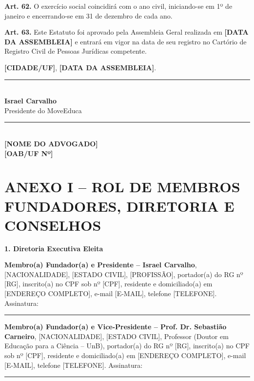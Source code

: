 \documentclass[11pt,a4paper]{article}
\begin{document}
\textbf{Art. 62.} O exercício social coincidirá com o ano civil, iniciando-se em 1º de janeiro e encerrando-se em 31 de dezembro de cada ano.

\textbf{Art. 63.} Este Estatuto foi aprovado pela Assembleia Geral realizada em \textbf{[DATA DA ASSEMBLEIA]} e entrará em vigor na data de seu registro no Cartório de Registro Civil de Pessoas Jurídicas competente.

\vspace{2cm}

\begin{center}
\textbf{[CIDADE/UF]}, \textbf{[DATA DA ASSEMBLEIA]}.

\vspace{2cm}

\rule{8cm}{0.4pt}\\
\textbf{Israel Carvalho}\\
Presidente do MoveEduca

\vspace{1.5cm}

\rule{8cm}{0.4pt}\\
\textbf{[NOME DO ADVOGADO]}\\
\textbf{[OAB/UF Nº]}
\end{center}

\newpage

\section*{ANEXO I -- ROL DE MEMBROS FUNDADORES, DIRETORIA E CONSELHOS}

\textbf{1. Diretoria Executiva Eleita}

\textbf{Membro(a) Fundador(a) e Presidente -- Israel Carvalho}, [NACIONALIDADE], [ESTADO CIVIL], [PROFISSÃO], portador(a) do RG nº [RG], inscrito(a) no CPF sob nº [CPF], residente e domiciliado(a) em [ENDEREÇO COMPLETO], e-mail [E-MAIL], telefone [TELEFONE]. Assinatura: \rule{6cm}{0.4pt}

\vspace{1em}

\textbf{Membro(a) Fundador(a) e Vice-Presidente -- Prof. Dr. Sebastião Carneiro}, [NACIONALIDADE], [ESTADO CIVIL], Professor (Doutor em Educação para a Ciência -- UnB), portador(a) do RG nº [RG], inscrito(a) no CPF sob nº [CPF], residente e domiciliado(a) em [ENDEREÇO COMPLETO], e-mail [E-MAIL], telefone [TELEFONE]. Assinatura: \rule{6cm}{0.4pt}

\vspace{1em}
\end{document}
